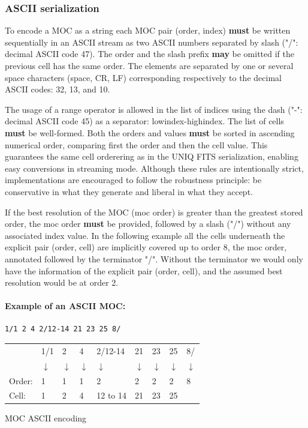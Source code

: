 \documentclass[11pt,a4paper]{ivoa}
\begin{document}
\subsubsection{ASCII serialization}
To encode a MOC as a string each MOC pair (order, index) {\bf must} be written
sequentially in an ASCII stream as two ASCII numbers separated
by slash ("/": decimal ASCII code 47). The order and the slash prefix
{\bf may} be omitted if the previous cell has the same order. The
elements are separated by one or several space characters (space, CR,
LF) corresponding respectively to the decimal ASCII codes: 32, 13, and
10.

The usage of a range operator is allowed in the list of indices using the
dash ("-": decimal ASCII code 45) as a separator: lowindex-highindex.
The list of cells {\bf must} be well-formed.
Both the orders and values {\bf must} be sorted in ascending numerical order,
comparing first the order and then the cell value.
This guarantees the same cell orderering as in the UNIQ FITS serialization,
enabling easy conversions in streaming mode.
Although these rules are intentionally strict, implementations are
encouraged to follow the robustness principle:
be conservative in what they generate and liberal in what they accept.


If the best resolution of the MOC (moc order) is greater than the
greatest stored order, the moc order {\bf must} be provided, followed
by a slash ("/") without any associated index value.
In the following example all the
cells underneath the explicit pair (order, cell) are implicitly covered
up to order 8, the moc order, annotated followed by the terminator "/".
Without the terminator we would only have the information of the explicit
pair (order, cell), and the assumed best resolution would be at order 2.


\paragraph{Example of an ASCII MOC:}
\begin{lstlisting}[]
    1/1 2 4 2/12-14 21 23 25 8/
\end{lstlisting}

\begin{center}
  {\small
  \begin{tabular} { l l l l l l l l l }
   & 1/1   & 2  & 4  & 2/12-14 & 21 & 23 &  25 & 8/ \\
   & $\downarrow$ & $\downarrow$ & $\downarrow$ & $\downarrow$ & $\downarrow$ & $\downarrow$ & $\downarrow$ & $\downarrow$ \\
Order:     & 1    & 1 & 1 & 2        & 2  &  2 & 2  & 8 \\
Cell:      & 1    & 2 & 4 & 12 to 14 & 21 & 23 & 25 & \\
\end{tabular}}

MOC ASCII encoding
\end{center}
\end{document}
